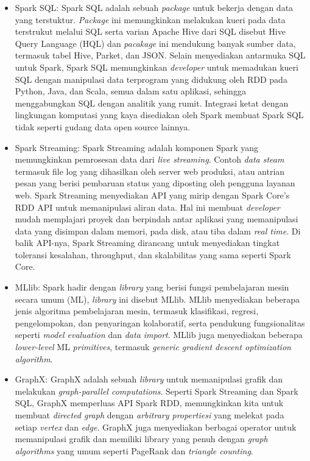 \documentclass[a4paper,twoside]{article}
\begin{document}
\begin{enumerate}
\begin{itemize}
\item Spark SQL: Spark SQL adalah sebuah \textit{package} untuk bekerja dengan data yang terstuktur. \textit{Package} ini memungkinkan melakukan kueri pada data terstrukut melalui SQL serta varian Apache Hive dari SQL disebut Hive Query Language (HQL) dan \textit{pacakage} ini mendukung banyak sumber data, termasuk tabel Hive, Parket, dan JSON. Selain menyediakan antarmuka SQL untuk Spark, Spark SQL memungkinkan \textit{developer} untuk memadukan kueri SQL dengan manipulasi data terprogram yang didukung oleh RDD pada Python, Java, dan Scala, semua dalam satu aplikasi, sehingga menggabungkan SQL dengan analitik yang rumit. Integrasi ketat dengan lingkungan komputasi yang kaya disediakan oleh Spark membuat Spark SQL tidak seperti gudang data open source lainnya.

\item Spark Streaming: Spark Streaming adalah komponen Spark yang memungkinkan pemrosesan data dari \textit{live streaming}. Contoh \textit{data steam} termasuk file log yang dihasilkan oleh server web produksi, atau antrian pesan yang berisi pembaruan status yang diposting oleh pengguna layanan web. Spark Streaming menyediakan API yang mirip dengan  Spark Core’s RDD API untuk memanipulasi aliran data. Hal ini membuat \textit{developer} mudah memplajari proyek dan berpindah antar aplikasi yang memanipulasi data yang disimpan dalam memori, pada disk, atau tiba dalam \textit{real time}. Di balik API-nya, Spark Streaming dirancang untuk menyediakan tingkat toleransi kesalahan, throughput, dan skalabilitas yang sama seperti Spark Core.

\item MLlib: Spark hadir dengan \textit{library} yang berisi fungsi pembelajaran mesin secara umum (ML), \textit{library} ini disebut MLlib. MLlib menyediakan beberapa jenis algoritma pembelajaran mesin, termasuk klasifikasi, regresi, pengelompokan, dan penyaringan kolaboratif, serta pendukung
fungsionalitas seperti \textit{model evaluation} dan \textit{data import}. MLlib juga menyediakan
beberapa \textit{lower-level} ML \textit{primitives}, termasuk \textit{generic gradient descent optimization
algorithm}.

\item GraphX: GraphX adalah sebuah \textit{library} untuk memanipulasi grafik dan melakukan \textit{graph-parallel computations}. Seperti Spark Streaming dan Spark SQL, GraphX ​​memperluas API Spark RDD, memungkinkan kita untuk membuat \textit{directed graph} dengan\textit{ arbitrary propertiesi} yang melekat pada setiap \textit{vertex} dan \textit{edge}. GraphX ​​juga menyediakan berbagai operator untuk memanipulasi grafik dan memiliki library yang penuh dengan \textit{graph algorithms} yang umum seperti PageRank dan \textit{triangle counting}.


\end{itemize}
\end{enumerate}
\end{document}
